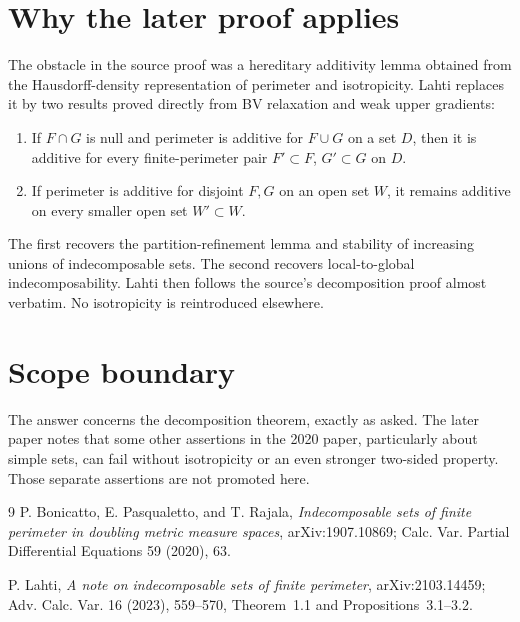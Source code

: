 \documentclass[11pt]{article}
\begin{document}
\section*{Why the later proof applies}
The obstacle in the source proof was a hereditary additivity lemma obtained
from the Hausdorff-density representation of perimeter and isotropicity.
Lahti replaces it by two results proved directly from BV relaxation and weak
upper gradients:
\begin{enumerate}
\item If $F\cap G$ is null and perimeter is additive for $F\cup G$ on a set
$D$, then it is additive for every finite-perimeter pair
$F'\subset F$, $G'\subset G$ on $D$.
\item If perimeter is additive for disjoint $F,G$ on an open set $W$, it
remains additive on every smaller open set $W'\subset W$.
\end{enumerate}
The first recovers the partition-refinement lemma and stability of increasing
unions of indecomposable sets. The second recovers local-to-global
indecomposability. Lahti then follows the source's decomposition proof almost
verbatim. No isotropicity is reintroduced elsewhere.

\section*{Scope boundary}
The answer concerns the decomposition theorem, exactly as asked. The later
paper notes that some other assertions in the 2020 paper, particularly about
simple sets, can fail without isotropicity or an even stronger two-sided
property. Those separate assertions are not promoted here.

\begin{thebibliography}{9}
P. Bonicatto, E. Pasqualetto, and T. Rajala,
\emph{Indecomposable sets of finite perimeter in doubling metric measure
spaces}, arXiv:1907.10869; Calc. Var. Partial Differential Equations 59
(2020), 63.

P. Lahti, \emph{A note on indecomposable sets of finite perimeter},
arXiv:2103.14459; Adv. Calc. Var. 16 (2023), 559--570,
Theorem~1.1 and Propositions~3.1--3.2.
\end{thebibliography}
\end{document}
